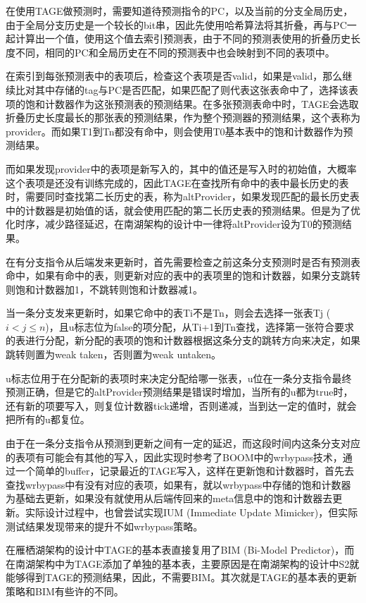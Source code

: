 在使用TAGE做预测时，需要知道待预测指令的PC，以及当前的分支全局历史，由于全局分支历史是一个较长的bit串，因此先使用哈希算法将其折叠，再与PC一起计算出一个值，使用这个值去索引预测表，由于不同的预测表使用的折叠历史长度不同，相同的PC和全局历史在不同的预测表中也会映射到不同的表项中。

在索引到每张预测表中的表项后，检查这个表项是否valid，如果是valid，那么继续比对其中存储的tag与PC是否匹配，如果匹配了则代表这张表命中了，选择该表项的饱和计数器作为这张预测表的预测结果。在多张预测表命中时，TAGE会选取折叠历史长度最长的那张表的预测结果，作为整个预测器的预测结果，这个表称为provider。而如果T1到Tn都没有命中，则会使用T0基本表中的饱和计数器作为预测结果。

而如果发现provider中的表项是新写入的，其中的值还是写入时的初始值，大概率这个表项是还没有训练完成的，因此TAGE在查找所有命中的表中最长历史的表时，需要同时查找第二长历史的表，称为altProvider，如果发现匹配的最长历史表中的计数器是初始值的话，就会使用匹配的第二长历史表的预测结果。但是为了优化时序，减少路径延迟，在南湖架构的设计中一律将altProvider设为T0的预测结果。


在有分支指令从后端发来更新时，首先需要检查之前这条分支预测时是否有预测表命中，如果有命中的表，则更新对应的表中的表项里的饱和计数器，如果分支跳转则饱和计数器加1，不跳转则饱和计数器减1。

当一条分支发来更新时，如果它命中的表Ti不是Tn，则会去选择一张表Tj ($i < j \le n$)，且u标志位为false的项分配，从Ti+1到Tn查找，选择第一张符合要求的表进行分配，新分配的表项的饱和计数器根据这条分支的跳转方向来决定，如果跳转则置为weak taken，否则置为weak untaken。

u标志位用于在分配新的表项时来决定分配给哪一张表，u位在一条分支指令最终预测正确，但是它的altProvider预测结果是错误时增加，当所有的u都为true时，还有新的项要写入，则复位计数器tick递增，否则递减，当到达一定的值时，就会把所有的u都复位。

由于在一条分支指令从预测到更新之间有一定的延迟，而这段时间内这条分支对应的表项有可能会有其他的写入，因此实现时参考了BOOM中的wrbypass技术，通过一个简单的buffer，记录最近的TAGE写入，这样在更新饱和计数器时，首先去查找wrbypass中有没有对应的表项，如果有，就以wrbypass中存储的饱和计数器为基础去更新，如果没有就使用从后端传回来的meta信息中的饱和计数器去更新。实际设计过程中，也曾尝试实现IUM (Immediate Update Mimicker)\cite{isl-tage}，但实际测试结果发现带来的提升不如wrbypass策略。

在雁栖湖架构的设计中TAGE的基本表直接复用了BIM (Bi-Model Predictor)\cite{bi-mode}，而在南湖架构中为TAGE添加了单独的基本表，主要原因是在南湖架构的设计中S2就能够得到TAGE的预测结果，因此，不需要BIM。其次就是TAGE的基本表的更新策略和BIM有些许的不同。

